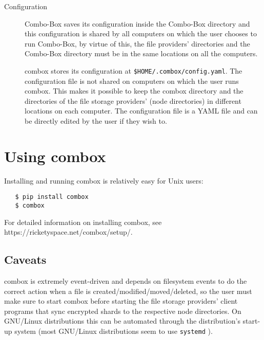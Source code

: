 \begin{description}
\item[Configuration] Combo-Box saves its configuration inside the
  Combo-Box directory and this configuration is shared by all
  computers on which the user chooses to run Combo-Box, by virtue of
  this, the file providers' directories and the Combo-Box directory
  must be in the same locations on all the computers.

  combox stores its configuration at
  \verb+$HOME/.combox/config.yaml+. The configuration file is not
  shared on computers on which the user runs combox. This makes it
  possible to keep the combox directory and the directories of the
  file storage providers' (node directories) in different locations on
  each computer. The configuration file is a YAML file and can be
  directly edited by the user if they wish to.
\end{description}

\section{Using combox}\label{1-sec-using-cb}

Installing and running combox is relatively easy for Unix users:

\begin{verbatim}
   $ pip install combox
   $ combox
\end{verbatim}

For detailed information on installing combox, see \\
https://ricketyspace.net/combox/setup/.

\subsection{Caveats}

combox is extremely event-driven and depends on filesystem events to
do the correct action when a file is created/modified/moved/deleted,
so the user must make sure to start combox before starting the file
storage providers' client programs that sync encrypted shards to the
respective node directories. On GNU/Linux distributions this can be
automated through the distribution's start-up system (most GNU/Linux
distributions seem to use \verb+systemd+ \cite{website:systemd}).

